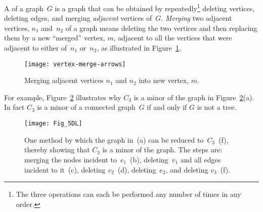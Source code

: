 \begin{definition}
  A  of a graph~$G$ is a graph that can be obtained by
  repeatedly\footnote{The three operations can each be performed any
    number of times in any order.} deleting vertices, deleting edges,
  and merging \emph{adjacent} vertices
  of~$G$.  \emph{Merging} two adjacent vertices, $n_1$ and~$n_2$ of a
  graph means deleting the two vertices and then replacing them by a
  new ``merged'' vertex, $m$, adjacent to all the vertices that were
  adjacent to either of~$n_1$ or~$n_2$, as illustrated in
  Figure~\ref{fig:merged}.
\end{definition}

\begin{figure}\redrawn

\texttt{[image: vertex-merge-arrows]}

\caption{Merging adjacent vertices $n_1$ and $n_2$ into new vertex, $m$.}
\label{fig:merged}
\end{figure}

For example, Figure~\ref{fig:5DL} illustrates why $C_3$ is a minor of
the graph in Figure~\ref{fig:5DL}(a).  In fact $C_3$ is a minor of a
connected graph~$G$ if and only if $G$ is not a tree.

\begin{figure}\redrawn


\texttt{[image: Fig\_5DL]}

\caption{One method by which the graph in~(a) can be reduced
  to~$C_3$~(f), thereby showing that $C_3$ is a minor of the graph.
  The steps are: merging the nodes incident to~$e_1$~(b),
  deleting~$v_1$ and all edges incident to it~(c), deleting $v_2$~(d),
deleting~$e_2$, and deleting $v_3$~(f).}

\label{fig:5DL}
\end{figure}


